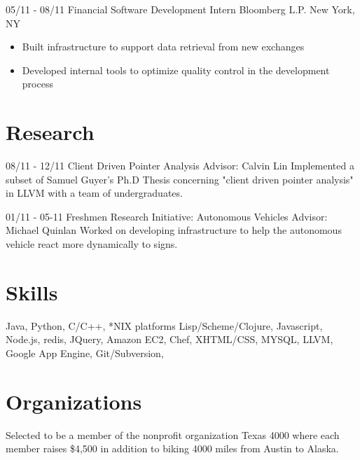 \documentclass[11pt,letter,sans]{moderncv}
\begin{document}
\cventry
{05/11 - 08/11}
{Financial Software Development Intern}
{Bloomberg L.P.}
{New York, NY}
{}
{
  \begin{itemize}
    \item Built infrastructure to support data retrieval from new exchanges
    \item Developed internal tools to optimize quality control in the
      development process
\end{itemize}}

\section{Research}
\cventry
{08/11 - 12/11}
{Client Driven Pointer Analysis}
{Advisor: Calvin Lin}
{}
{}
{Implemented a subset of Samuel Guyer's Ph.D Thesis concerning "client driven
pointer analysis" in LLVM with a team of undergraduates.}

\cventry
{01/11 - 05-11}
{Freshmen Research Initiative: Autonomous Vehicles}
{Advisor: Michael Quinlan}
{}
{}
{Worked on developing infrastructure to help the autonomous vehicle react more
dynamically to signs.} 

\section{Skills}
{Java, Python, C/C++, *NIX platforms}
{Lisp/Scheme/Clojure, Javascript, Node.js, redis, JQuery, Amazon EC2, Chef,
XHTML/CSS, MYSQL, LLVM, Google App Engine, Git/Subversion, }


\section{Organizations}
{Selected to be a member of the nonprofit organization Texas 4000 where each
member raises \$4,500 in addition to biking 4000 miles from Austin to Alaska.}

\end{document}
